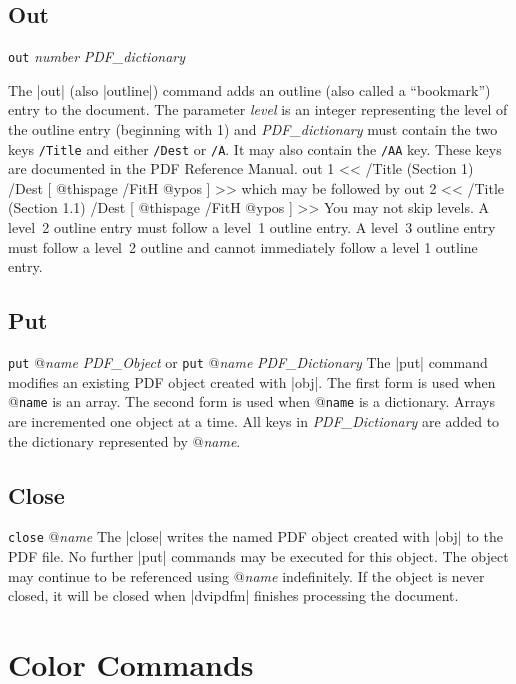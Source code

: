 {\subsection{Out}
\syntax
{\tt out} {\it number} {\it PDF\_dictionary}

\description
The |out| (also |outline|) command adds an outline (also called a ``bookmark'') entry
to the document.
The parameter {\it level} is an integer representing the
level of the outline entry (beginning with 1) and
{\it  PDF\_dictionary} must contain
the two keys {\tt /Title} and either {\tt /Dest} or {\tt /A}.
It may also contain the {\tt /AA} key.  These keys are documented
in the PDF Reference Manual.
\example
\begintt
out 1 << /Title (Section 1) /Dest [ @thispage /FitH @ypos ] >>
\endtt
which may be followed by
\begintt
out 2 << /Title (Section 1.1) /Dest [ @thispage /FitH @ypos ] >>
\endtt
\note
You may not skip levels.  A level~2 outline entry
must follow a level~1 outline
entry.  A level~3 outline entry must follow a level~2 outline
and cannot immediately follow a level 1 outline entry.

\subsection{Put}
\beginlist
{\tt put} @{\it name} {\it PDF\_Object}
\endlist
or 
\beginlist
{\tt put} @{\it name} {\it PDF\_Dictionary}
\endlist
\description
The |put| command modifies an existing PDF object created with |obj|.
The first form is used when @{\tt name} is an array.  The second
form is used when @{\tt name} is a dictionary.  Arrays are
incremented one object at a time.  All keys in {\it PDF\_Dictionary}
are added to the dictionary represented by @{\it name}.
\example
\begintt
{}
\endtt

\subsection{Close}
\syntax
{\tt close} @{\it name}
\description
The |close| writes the named PDF object created with |obj| to the PDF file.
No further |put| commands may be executed for this object.
The object may continue to be referenced using @{\it name}
indefinitely.  If the object is never closed, it will
be closed when |dvipdfm| finishes processing the document.

\section{Color Commands}
}
